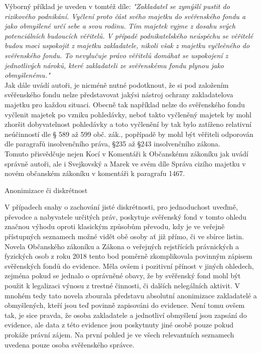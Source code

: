 \documentclass{article}
\begin{document}
 Výborný příklad je uveden v tomtéž díle: \textit{"Zakladatel se zymýšlí pustit do rizikového podnikání. Vyčlení proto část svého majetku do svěřenského fondu a jako obmyšlené určí sebe a svou rodinu. Tím majetek vyjme z dosahu svých potenciálních budoucích věřitelů. V případě podnikatelského neúspěchu se věřitelé budou moci uspokojit z majetku zakladatele, nikoli však z majetku vyčleěného do svěřenského fondu. To nevylučuje právo věřitelů domáhat se uspokojení z jednotlivých nároků, které zakladateli ze svěřenskému fondu plynou jako obmyšlenému."}\\
 
 Jak dále uvádí autoři, je nicméně nutné podotknout, že si pod založením svěřenského fondu nelze představovat jakýsi nástroj ochrany zakladatelova majetku pro každou situaci. Obecně tak například nelze do svěřenského fondu vyčlenit majetek po vzniku pohledávky, neboť takto vyčleněný majetek by mohl zhoršit dobyvatelnost pohledávky a toto vyčlenění by tak bylo zatíženo relativní neúčinností dle § 589 až 599 obč. zák., popřípadě by mohl být věřiteli odporován dle paragrafů insolvenčního práva, §235 až §243 insolvenčního zákona.\\
 
 Tomuto přisvědčuje nejen Kocí v Komentáři k Občanskému zákoníku jak uvádí správně autoři, ale i Svejkovský a Marek ve svém díle Správa cizího majetku v novém občanském zákoníku v komentáři k paragrafu 1467.\\
 
 
  \begin{enumerate}
 {\Large\item[3.] Anonimizace či diskrétnost}
 \end{enumerate}
 
 V případech snahy o zachování jisté diskrétnosti, pro jednoduchost uveďmě, převodce a nabyvatele určitých práv, poskytuje svěřenský fond v tomto ohledu značnou výhodu oproti klasickým způsobům převodu, kdy je ve veřejně přístupných seznamech možné vidět obě osoby ať již přímo, či ve sbírce listin. Novela Občanského zákoníku a Zákona o veřejných rejstřících právnických a fyzických osob z roku 2018 tento bod poměrně zkomplikovala povinným zápisem svěřenských fondů do evidence. Měla ovšem i pozitivní přínost v jiných ohledech, zejména pokud se jednalo o oprávněné obavy, že by svěřenský fond mohl být použit k legalizaci výnosu z trestné činnosti, či dalších nelegálních aktivit. V mnohém tedy tato novela zbourala představu absolutní anonimizace zakladatelé a obmyšlených, kteří jsou teď povinně zapisováni do evidence. Není tomu ovšem tak, je sice pravda, že osoba zakladatele a jednotliví obmyšlení jsou zapsání do evidence, ale data z této evidence jsou poskytnuty jiné osobě pouze pokud prokáže právní zájem. Na první pohled je ve všech relevantních seznamech uvedena pouze osoba svěřenského správce.\\
 
\end{document}
